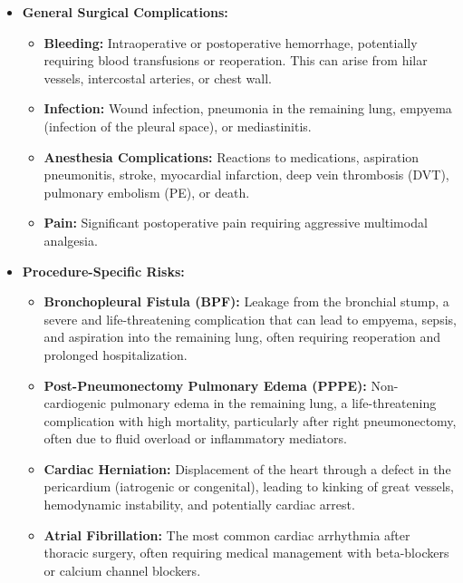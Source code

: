 \begin{itemize}
  \item \textbf{General Surgical Complications:}
  
  \begin{itemize}
    \item \textbf{Bleeding:} Intraoperative or postoperative hemorrhage, potentially requiring blood transfusions or reoperation. This can arise from hilar vessels, intercostal arteries, or chest wall.
    
    \item \textbf{Infection:} Wound infection, pneumonia in the remaining lung, empyema (infection of the pleural space), or mediastinitis.
    
    \item \textbf{Anesthesia Complications:} Reactions to medications, aspiration pneumonitis, stroke, myocardial infarction, deep vein thrombosis (DVT), pulmonary embolism (PE), or death.
    
    \item \textbf{Pain:} Significant postoperative pain requiring aggressive multimodal analgesia.
  \end{itemize}
  
  \item \textbf{Procedure-Specific Risks:}
  
  \begin{itemize}
    \item \textbf{Bronchopleural Fistula (BPF):} Leakage from the bronchial stump, a severe and life-threatening complication that can lead to empyema, sepsis, and aspiration into the remaining lung, often requiring reoperation and prolonged hospitalization.
    
    \item \textbf{Post-Pneumonectomy Pulmonary Edema (PPPE):} Non-cardiogenic pulmonary edema in the remaining lung, a life-threatening complication with high mortality, particularly after right pneumonectomy, often due to fluid overload or inflammatory mediators.
    
    \item \textbf{Cardiac Herniation:} Displacement of the heart through a defect in the pericardium (iatrogenic or congenital), leading to kinking of great vessels, hemodynamic instability, and potentially cardiac arrest.
    
    \item \textbf{Atrial Fibrillation:} The most common cardiac arrhythmia after thoracic surgery, often requiring medical management with beta-blockers or calcium channel blockers.
    

\end{itemize}
\end{itemize}
